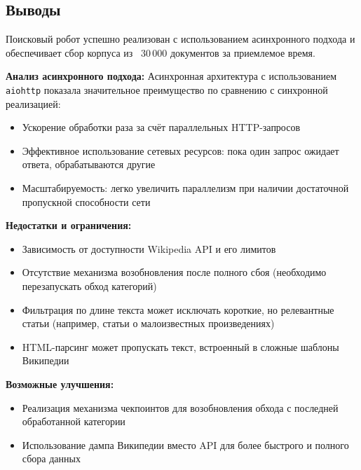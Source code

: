 \subsection{Выводы}

Поисковый робот успешно реализован с использованием асинхронного подхода и обеспечивает сбор корпуса из ~30\,000 документов за приемлемое время.

\textbf{Анализ асинхронного подхода:}
Асинхронная архитектура с использованием \texttt{aiohttp} показала значительное преимущество по сравнению с синхронной реализацией:
\begin{itemize}
    \item Ускорение обработки раза за счёт параллельных HTTP-запросов
    \item Эффективное использование сетевых ресурсов: пока один запрос ожидает ответа, обрабатываются другие
    \item Масштабируемость: легко увеличить параллелизм при наличии достаточной пропускной способности сети
\end{itemize}


\textbf{Недостатки и ограничения:}
\begin{itemize}
    \item Зависимость от доступности Wikipedia API и его лимитов
    \item Отсутствие механизма возобновления после полного сбоя (необходимо перезапускать обход категорий)
    \item Фильтрация по длине текста может исключать короткие, но релевантные статьи (например, статьи о малоизвестных произведениях)
    \item HTML-парсинг может пропускать текст, встроенный в сложные шаблоны Википедии
\end{itemize}

\textbf{Возможные улучшения:}
\begin{itemize}
    \item Реализация механизма чекпоинтов для возобновления обхода с последней обработанной категории
    \item Использование дампа Википедии вместо API для более быстрого и полного сбора данных
\end{itemize}

\pagebreak

